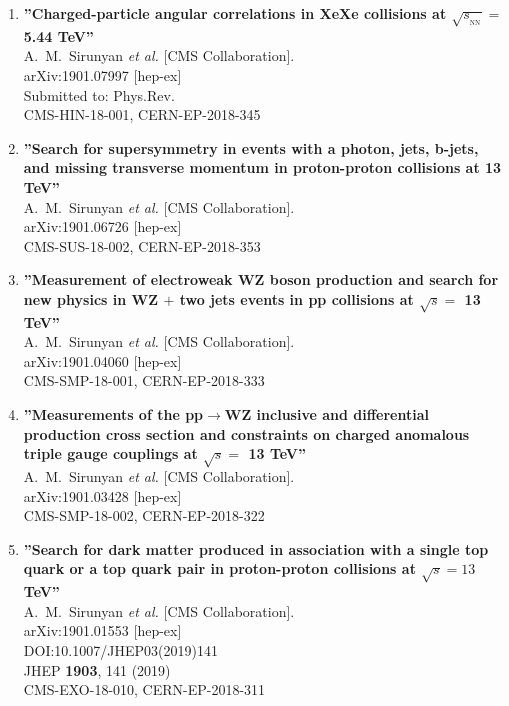 \begin{enumerate}
\item%
{\bf ''Charged-particle angular correlations in XeXe collisions at $\sqrt{s_{_\mathrm{NN}}}=$ 5.44 TeV''}
  \\{}A.~M.~Sirunyan {\it et al.} [CMS Collaboration].
  \\{}arXiv:1901.07997 [hep-ex]
  \\{}Submitted to: Phys.Rev.
  \\{}CMS-HIN-18-001, CERN-EP-2018-345

\item%
{\bf ''Search for supersymmetry in events with a photon, jets, b-jets, and missing transverse momentum in proton-proton collisions at 13 TeV''}
  \\{}A.~M.~Sirunyan {\it et al.} [CMS Collaboration].
  \\{}arXiv:1901.06726 [hep-ex]
  \\{}CMS-SUS-18-002, CERN-EP-2018-353

\item%
{\bf ''Measurement of electroweak WZ boson production and search for new physics in WZ $+$ two jets events in pp collisions at $\sqrt{s} =$ 13 TeV''}
  \\{}A.~M.~Sirunyan {\it et al.} [CMS Collaboration].
  \\{}arXiv:1901.04060 [hep-ex]
  \\{}CMS-SMP-18-001, CERN-EP-2018-333

\item%
{\bf ''Measurements of the pp$\to$WZ inclusive and differential production cross section and constraints on charged anomalous triple gauge couplings at $\sqrt{s} =$ 13 TeV''}
  \\{}A.~M.~Sirunyan {\it et al.} [CMS Collaboration].
  \\{}arXiv:1901.03428 [hep-ex]
  \\{}CMS-SMP-18-002, CERN-EP-2018-322

\item%
{\bf ''Search for dark matter produced in association with a single top quark or a top quark pair in proton-proton collisions at $ \sqrt{s}=13 $ TeV''}
  \\{}A.~M.~Sirunyan {\it et al.} [CMS Collaboration].
  \\{}arXiv:1901.01553 [hep-ex]
  \\{}DOI:10.1007/JHEP03(2019)141
  \\{}JHEP {\bf 1903}, 141 (2019)
  \\{}CMS-EXO-18-010, CERN-EP-2018-311


\end{enumerate}
